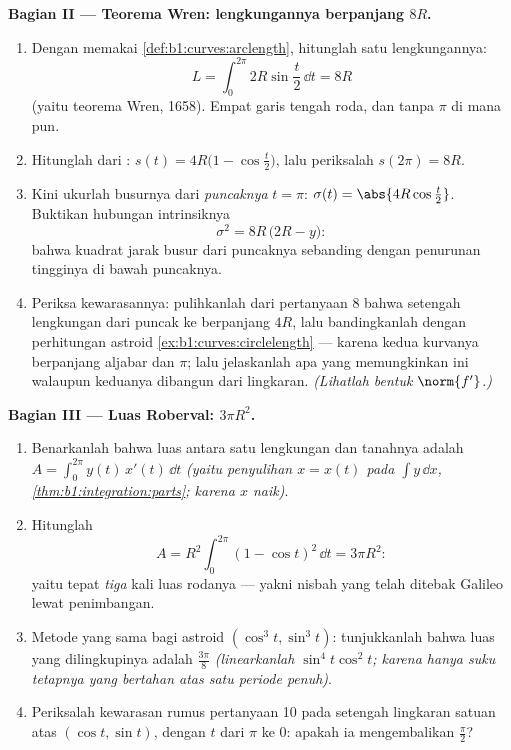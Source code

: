 \begin{problem}
\medskip
\noindent\textbf{Bagian II --- Teorema Wren: lengkungannya berpanjang
$8R$.}
\begin{enumerate}[resume]
  \item Dengan memakai \cref{def:b1:curves:arclength}, hitunglah 
        satu lengkungannya:
        \[
        L = \int_0^{2\pi} 2R\sin\frac t2\,\dd t = 8R
        \]
        (yaitu teorema Wren, 1658). Empat garis tengah roda, dan tanpa
        $\pi$ di mana pun.
  \item Hitunglah  dari : $s(t) =
        4R\bigl(1 - \cos\frac t2\bigr)$, lalu periksalah $s(2\pi) =
        8R$.
  \item Kini ukurlah busurnya dari \emph{puncaknya} $t = \pi$:
        $\sigma(t) = \abs{4R\cos\frac t2}$. Buktikan hubungan
        intrinsiknya
        \[
        \sigma^2 = 8R\,\bigl(2R - y\bigr) :
        \]
        bahwa kuadrat jarak busur dari puncaknya sebanding dengan
        penurunan tingginya di bawah puncaknya.
  \item Periksa kewarasannya: pulihkanlah dari pertanyaan 8 bahwa setengah lengkungan
        dari puncak ke  berpanjang $4R$, lalu bandingkanlah dengan
        perhitungan astroid \cref{ex:b1:curves:circlelength}
        --- karena kedua kurvanya berpanjang aljabar dan  $\pi$;
        lalu jelaskanlah apa yang memungkinkan ini walaupun keduanya
        dibangun dari lingkaran. \emph{(Lihatlah bentuk
        $\norm{f'}$.)}
\end{enumerate}

\medskip
\noindent\textbf{Bagian III --- Luas Roberval: $3\pi R^2$.}
\begin{enumerate}[resume]
  \item Benarkanlah bahwa luas antara satu lengkungan dan tanahnya adalah
        $A = \int_0^{2\pi} y(t)\,x'(t)\,\dd t$ \emph{(yaitu
        penyulihan $x = x(t)$ pada $\int y\,\dd x$,
        \cref{thm:b1:integration:parts}; karena $x$ naik)}.
  \item Hitunglah
        \[
        A = R^2\int_0^{2\pi}(1 - \cos t)^2\,\dd t = 3\pi R^2 :
        \]
        yaitu tepat \emph{tiga} kali luas rodanya ---
        yakni nisbah yang telah ditebak Galileo lewat penimbangan.
  \item Metode yang sama bagi astroid $(\cos^3t, \sin^3t)$: tunjukkanlah
        bahwa luas yang dilingkupinya adalah $\frac{3\pi}8$
        \emph{(linearkanlah $\sin^4 t\cos^2 t$; karena hanya suku
        tetapnya yang bertahan atas satu periode penuh)}.
  \item Periksalah kewarasan rumus pertanyaan 10 pada setengah lingkaran
        satuan atas $(\cos t, \sin t)$, dengan $t$ dari $\pi$ ke $0$:
        apakah ia mengembalikan $\frac\pi2$?
\end{enumerate}


\end{problem}
